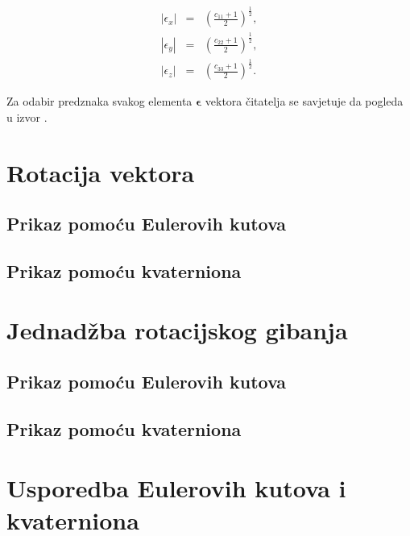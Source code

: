 \documentclass[times, utf8, diplomski, numeric]{templates/template}
\begin{document}
{{{{                \begin{equation}
                \begin{array}{rcl}
                    |\epsilon_{x}| & = & (\frac{c_{11} + 1}{2})^{\frac{1}{2}}, \\
                    |\epsilon_{y}| & = & (\frac{c_{22} + 1}{2})^{\frac{1}{2}}, \\
                    |\epsilon_{z}| & = & (\frac{c_{33} + 1}{2})^{\frac{1}{2}}.
                \end{array}
                \end{equation}

                Za odabir predznaka svakog elementa $\boldsymbol\epsilon$ vektora čitatelja se savjetuje da pogleda u izvor \cite{adcsKnjiga}.
            }
        }
    }

    \section{Rotacija vektora}{
        \subsection{Prikaz pomoću Eulerovih kutova}{
        }

        \subsection{Prikaz pomoću kvaterniona}{
        }
    }

    \section{Jednadžba rotacijskog gibanja}{
        \subsection{Prikaz pomoću Eulerovih kutova}{
        }

        \subsection{Prikaz pomoću kvaterniona}{
        }

        \section{Usporedba Eulerovih kutova i kvaterniona}{
        }
    }
}
\end{document}
